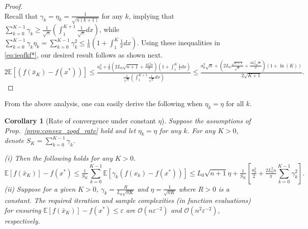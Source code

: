 \documentclass[11pt,reqno]{amsart}
\newcommand{\1}{{\bf 1}}
\newcommand{\2}{{\bf 2}}
\newcommand{\pc}[1]{{\color{cyan}#1}}
\newcommand{\E}{\mathbb E}
\newcommand{\cO}{\mathcal O}
\numberwithin{equation}{section}
\newtheorem{corollary}{Corollary}[section]
\theoremstyle{remark}
\begin{document}
{\begin{proof}
\begin{equation}
		\end{equation}
		Recall that $\gamma_k=\eta_k={\tfrac{1}{\sqrt{n(k+1)}}}$ for any $k$, implying that $\sum_{k=0}^{{K-1}} \gamma_{k} \geq \tfrac{1}{\sqrt{n}}(\int_{1}^{K+{1}} \tfrac{1}{\sqrt{x}} d x)$, while $\sum_{k=0}^{{K-1}} \gamma_k\eta_k=  \sum_{k=0}^{{K-1}} \gamma_{k}^2 \leq \tfrac{1}{n}(1+\int_{1}^{{K}} \tfrac{1}{x} d x)$. Using these inequalities in \eqref{eq:ieqfkf*}, our desired result follows as shown next.  
		\begin{equation*}
			2\mathbb{E}[\left(f(\bar{x}_K)-f(x^*)\right)] \leq \tfrac{a_{0}^{2}+{\frac{1}{n}}\left(2L_0\sqrt{n+1}+\frac{4L_0^2n}{ \pi}\right) \left(1+\int_{1}^{{K}} \frac{1}{x} d x\right)}{\frac{1}{\sqrt{n}}\left(\int_{1}^{K+{1}} \frac{1}{\sqrt{x}} d x\right)} \leq \tfrac{a_{0}^{2}{\sqrt{n}}+\left(2L_0{\frac{\sqrt{n+1}}{\sqrt{n}}}+\frac{4L_0^2{\sqrt{n}}}{ \pi}\right)\left(1+\ln ({K})\right)}{2 \sqrt{K+{1}}}.
		\end{equation*}
		\end{proof}
		\smallskip
		From the above analysis, one can easily derive the following when $\eta_k = \eta$ for all $k$.
		\smallskip
		
		\begin{corollary}[Rate of convergence under constant $\eta$]\label{Coro:2}
			Suppose the assumptions of Prop.~\ref{prop:convex_zogd_rate} hold and 
			let $\eta_k=\eta$ for any $k$. For any $K>0$, denote $S_K=\sum_{k=0}^{{K-1}} \gamma_k$.%
			
			\noindent (i)  Then the following holds for any $K > 0$. 
			\begin{equation*}
				\mathbb{E}[f(\bar{x}_K)]-f(x^*) \leq \tfrac{1}{S_K}\sum_{k=0}^{K-1}\mathbb{E}[\gamma_k \left(f(x_k)-f(x^*)\right)] \leq L_0\sqrt{n+1}\eta +\tfrac{1}{S_K}\left[\tfrac{a_0^2}{2}+\tfrac{2L_0^2n}{\pi}\sum_{k=0}^{K-1}\gamma_k^2\right].
			\end{equation*}
			\noindent (ii) Suppose for a given $K > 0$, $\gamma_k=\tfrac{R}{L_0 \sqrt{nK}}$ and $\eta = \tfrac{1}{\sqrt{nK}}$ where $R>0$ is a constant. The required iteration and sample complexities (in function evaluations) for ensuring $\E\left[f(\bar{x}_K)\right]-f(x^\ast)\leq \varepsilon $ are $\cO(n\varepsilon^{-2})$ and $\cO(n^2 \varepsilon^{-2})$, respectively.
			

\end{corollary}}
\end{document}
